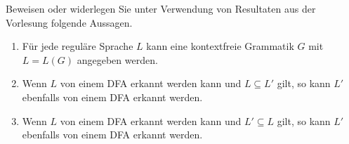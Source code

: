 
\begin{exercise}
Beweisen oder widerlegen Sie unter Verwendung von Resultaten aus der Vorlesung folgende Aussagen.
\begin{enumerate}
\item Für jede reguläre Sprache $L$ kann eine kontextfreie 
  Grammatik $G$ mit $L=L(G)$ angegeben werden.
\item Wenn $L$ von einem DFA erkannt werden kann und $L\subseteq L'$ gilt, 
  so kann $L'$ ebenfalls von einem DFA erkannt werden.
\item Wenn $L$  von einem DFA erkannt werden kann und $L'\subseteq L$ gilt, 
  so kann $L'$ ebenfalls von einem DFA erkannt werden.
\end{enumerate}
\end{exercise}

